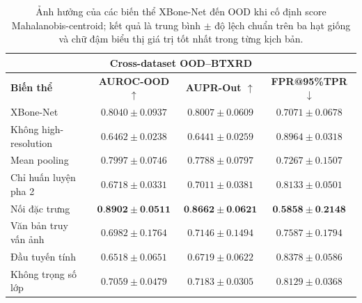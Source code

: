 \begin{table}[H]
\begin{tabular}{|l|c|c|c|}
\hline
\multicolumn{4}{|c|}{\textbf{Cross-dataset OOD--BTXRD}} \\ \hline
\textbf{Biến thể} & \textbf{AUROC-OOD $\uparrow$} &
\textbf{AUPR-Out $\uparrow$} & \textbf{FPR@95\%TPR $\downarrow$} \\ \hline
\cellcolor{gray!12}XBone-Net &
\cellcolor{gray!12}$0{.}8040\pm0{.}0937$ &
\cellcolor{gray!12}$0{.}8007\pm0{.}0609$ &
\cellcolor{gray!12}$0{.}7071\pm0{.}0678$ \\ \hline
Không high-resolution &
$0{.}6462\pm0{.}0238$ & $0{.}6441\pm0{.}0259$ & $0{.}8964\pm0{.}0318$ \\ \hline
Mean pooling &
$0{.}7997\pm0{.}0746$ & $0{.}7788\pm0{.}0797$ & $0{.}7267\pm0{.}1507$ \\ \hline
Chỉ huấn luyện pha 2 &
$0{.}6718\pm0{.}0331$ & $0{.}7011\pm0{.}0381$ & $0{.}8133\pm0{.}0501$ \\ \hline
Nối đặc trưng &
$\mathbf{0{.}8902\pm0{.}0511}$ & $\mathbf{0{.}8662\pm0{.}0621}$ & $\mathbf{0{.}5858\pm0{.}2148}$ \\ \hline
Văn bản truy vấn ảnh &
$0{.}6982\pm0{.}1764$ & $0{.}7146\pm0{.}1494$ & $0{.}7587\pm0{.}1794$ \\ \hline
Đầu tuyến tính &
$0{.}6518\pm0{.}0651$ & $0{.}6719\pm0{.}0622$ & $0{.}8378\pm0{.}0586$ \\ \hline
Không trọng số lớp &
$0{.}7059\pm0{.}0479$ & $0{.}7183\pm0{.}0305$ & $0{.}8129\pm0{.}0368$ \\ \hline
\end{tabular}
\caption{Ảnh hưởng của các biến thể XBone-Net đến OOD khi cố định score Mahalanobis-centroid; kết quả là trung bình $\pm$ độ lệch chuẩn trên ba hạt giống và chữ đậm biểu thị giá trị tốt nhất trong từng kịch bản.}
\label{tab:ablation_ood_mahalanobis}
\end{table}
